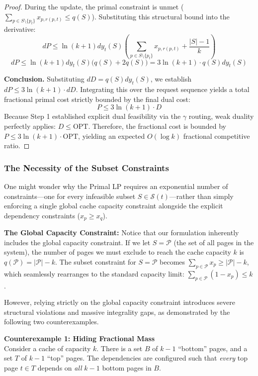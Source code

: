 \documentclass[a4paper]{article}
\begin{document}
\begin{proof}
During the update, the primal constraint is unmet ($\sum_{p \in S \setminus \{p_t\}} x_{p,r(p,t)} \le q(S)$). Substituting this structural bound into the derivative:
$$ dP \le \ln(k+1) dy_t(S) \left( \sum_{p \in S \setminus \{p_t\}} x_{p,r(p,t)} + \frac{|S|-1}{k} \right) $$
$$ dP \le \ln(k+1) dy_t(S) \Big( q(S) + 2q(S) \Big) = 3 \ln(k+1) \cdot q(S) dy_t(S) $$

\textbf{Conclusion.} Substituting $dD = q(S) dy_t(S)$, we establish $dP \le 3 \ln(k+1) \cdot dD$. Integrating this over the request sequence yields a total fractional primal cost strictly bounded by the final dual cost:
$$ P \le 3 \ln(k+1) \cdot D $$
Because Step 1 established explicit dual feasibility via the $\gamma$ routing, weak duality perfectly applies: $D \le \text{OPT}$. Therefore, the fractional cost is bounded by $P \le 3 \ln(k+1) \cdot \text{OPT}$, yielding an expected $O(\log k)$ fractional competitive ratio.
\end{proof}

\subsubsection{The Necessity of the Subset Constraints}

One might wonder why the Primal LP requires an exponential number of constraints---one for every infeasible subset $S \in \mathcal{S}(t)$---rather than simply enforcing a single global cache capacity constraint alongside the explicit dependency constraints ($x_p \ge x_q$). 

\textbf{The Global Capacity Constraint:} Notice that our formulation inherently includes the global capacity constraint. If we let $S = \mathcal{P}$ (the set of all pages in the system), the number of pages we must exclude to reach the cache capacity $k$ is $q(\mathcal{P}) = |\mathcal{P}| - k$. The subset constraint for $S = \mathcal{P}$ becomes $\sum_{p \in \mathcal{P}} x_p \ge |\mathcal{P}| - k$, which seamlessly rearranges to the standard capacity limit: $\sum_{p \in \mathcal{P}} (1 - x_p) \le k$.

However, relying strictly on the global capacity constraint introduces severe structural violations and massive integrality gaps, as demonstrated by the following two counterexamples.

\textbf{Counterexample 1: Hiding Fractional Mass} \\
Consider a cache of capacity $k$. There is a set $B$ of $k-1$ ``bottom'' pages, and a set $T$ of $k-1$ ``top'' pages. The dependencies are configured such that \textit{every} top page $t \in T$ depends on \textit{all} $k-1$ bottom pages in $B$.
\end{document}

